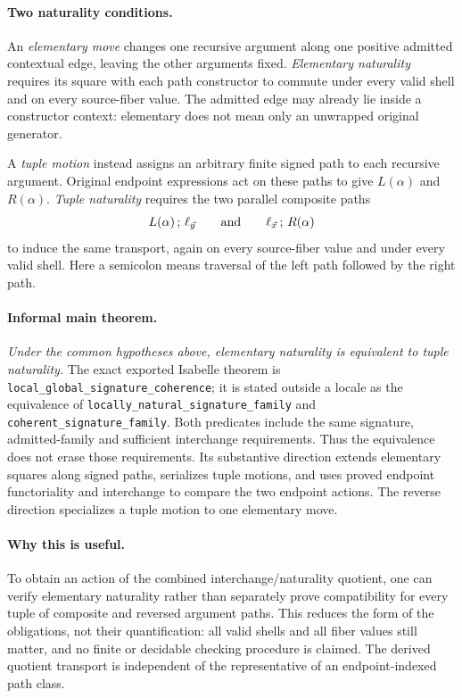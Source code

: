 \documentclass[11pt,a4paper]{article}
\begin{document}
\paragraph{Two naturality conditions.}
An \emph{elementary move} changes one recursive argument along one positive
admitted contextual edge, leaving the other arguments fixed.
\emph{Elementary naturality} requires its square with each path constructor
to commute under every valid shell and on every source-fiber value. The
admitted edge may already lie inside a constructor context: elementary does
not mean only an unwrapped original generator.

A \emph{tuple motion} instead assigns an arbitrary finite signed path to each
recursive argument. Original endpoint expressions act on these paths to give
\(L(\alpha)\) and \(R(\alpha)\). \emph{Tuple naturality} requires the two
parallel composite paths
\[
 L(\alpha)\,;\,\ell_{\vec y}
 \qquad\hbox{and}\qquad
 \ell_{\vec x}\,;\,R(\alpha)
\]
to induce the same transport, again on every source-fiber value and under
every valid shell. Here a semicolon means traversal of the left path followed
by the right path.

\paragraph{Informal main theorem.}
\emph{Under the common hypotheses above, elementary naturality is equivalent
to tuple naturality.} The exact exported Isabelle theorem is
\texttt{local\_global\_signature\_coherence}; it is stated outside a locale
as the equivalence of \texttt{locally\_natural\_signature\_family} and
\texttt{coherent\_signature\_family}. Both predicates include the same
signature, admitted-family and sufficient interchange requirements. Thus the
equivalence does not erase those requirements. Its substantive direction
extends elementary squares along signed paths, serializes tuple motions, and
uses proved endpoint functoriality and interchange to compare the two endpoint
actions. The reverse direction specializes a tuple motion to one elementary
move.

\paragraph{Why this is useful.}
To obtain an action of the combined interchange/naturality quotient, one can
verify elementary naturality rather than separately prove compatibility for
every tuple of composite and reversed argument paths. This reduces the form
of the obligations, not their quantification: all valid shells and all fiber
values still matter, and no finite or decidable checking procedure is claimed.
The derived quotient transport is independent of the representative of an
endpoint-indexed path class.
\end{document}
